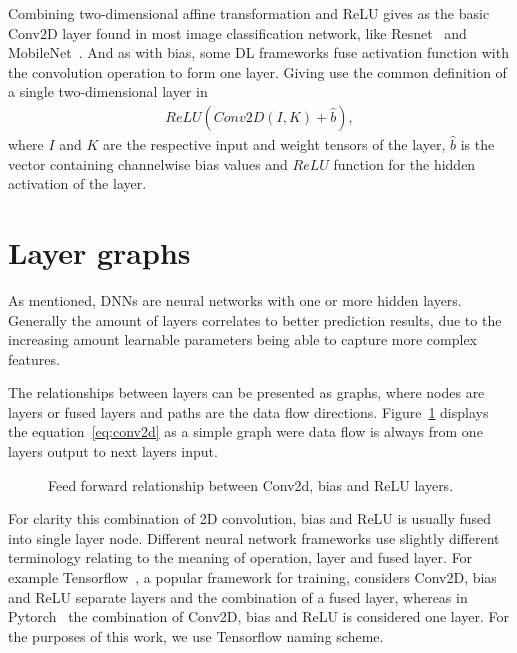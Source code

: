 \documentclass[12pt,a4paper,english
]{tunithesis}
\begin{document}
Combining two-dimensional affine transformation and ReLU gives as the basic Conv2D layer found in most image classification network, like Resnet~\parencite{he2015deepresiduallearningimage} and MobileNet~\parencite{howard2017mobilenetsefficientconvolutionalneural}.
And as with bias, some DL frameworks fuse activation function with the convolution operation to form one layer. Giving use the common definition of a single two-dimensional layer in
\begin{align}
ReLU(Conv2D(I, K) + \hat{b}),
\label{eq:conv2d}
\end{align}
where $I$ and $K$ are the respective input and weight tensors of the layer,  $\hat{b}$ is the vector containing channelwise bias values and $ReLU$ function for the hidden activation of the layer.

\section{Layer graphs}
As mentioned, DNNs are neural networks with one or more hidden layers. Generally the amount of layers correlates to better prediction results, due to the increasing amount learnable parameters being able to capture more complex features.

The relationships between layers can be presented as graphs, where nodes are layers or fused layers and paths are the data flow directions. Figure~\ref{fig:conv2d-layer} displays the equation~\ref{eq:conv2d} as a simple graph were data flow is always from one layers output to next layers input.

\begin{figure}[ht]
\centering
{}
\caption{Feed forward relationship between Conv2d, bias and ReLU layers.}
\label{fig:conv2d-layer}
\end{figure}
For clarity this combination of 2D convolution, bias and ReLU is usually fused into single layer node. Different neural network frameworks use slightly different terminology relating to the meaning of operation, layer and fused layer. For example Tensorflow~\parencite{tensorflow2015-whitepaper}, a popular framework for training, considers Conv2D, bias and ReLU separate layers and the combination of a fused layer, whereas in Pytorch~\cite{pytorch} the combination of Conv2D, bias and ReLU is considered one layer. For the purposes of this work, we use Tensorflow naming scheme.
\end{document}
